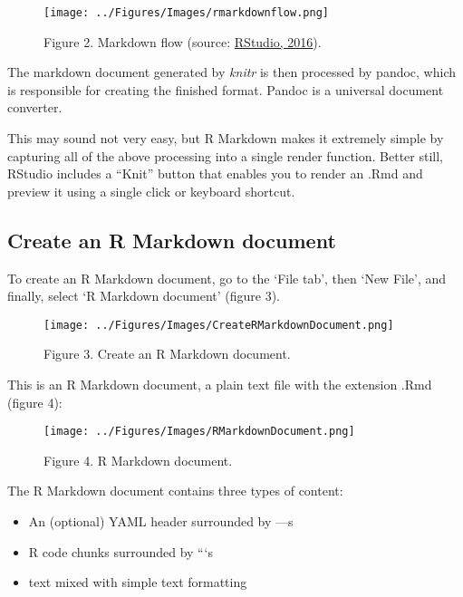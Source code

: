 \documentclass[
]{article}
\begin{document}
\begin{figure}
\centering
\texttt{[image: ../Figures/Images/rmarkdownflow.png]}
\caption{Figure 2. Markdown flow (source:
\href{https://eu01.alma.exlibrisgroup.com/leganto/public/44UOE_INST/citation/37711529450002466?auth=SAML}{RStudio,
2016}).}
\end{figure}

The markdown document generated by \emph{knitr} is then processed by
pandoc, which is responsible for creating the finished format. Pandoc is
a universal document converter.

This may sound not very easy, but R Markdown makes it extremely simple
by capturing all of the above processing into a single render function.
Better still, RStudio includes a ``Knit'' button that enables you to
render an .Rmd and preview it using a single click or keyboard shortcut.

\hypertarget{create-an-r-markdown-document}{%
\subsection{\texorpdfstring{\textbf{Create an R Markdown
document}}{Create an R Markdown document}}\label{create-an-r-markdown-document}}

To create an R Markdown document, go to the `File tab', then `New File',
and finally, select `R Markdown document' (figure 3).

\begin{figure}
\centering
\texttt{[image: ../Figures/Images/CreateRMarkdownDocument.png]}
\caption{Figure 3. Create an R Markdown document.}
\end{figure}

This is an R Markdown document, a plain text file with the extension
.Rmd (figure 4):

\begin{figure}
\centering
\texttt{[image: ../Figures/Images/RMarkdownDocument.png]}
\caption{Figure 4. R Markdown document.}
\end{figure}

The R Markdown document contains three types of content:

\begin{itemize}
\item
  An (optional) YAML header surrounded by ---s
\item
  R code chunks surrounded by ```s
\item
  text mixed with simple text formatting
\end{itemize}
\end{document}
